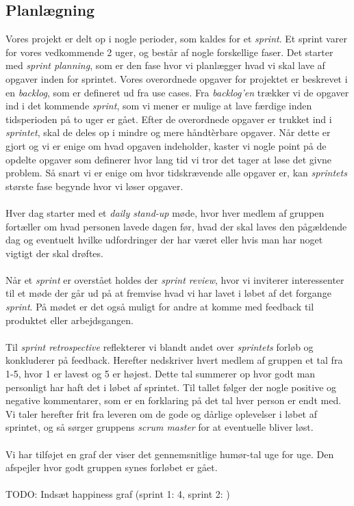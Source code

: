 \subsection{Planlægning}
Vores projekt er delt op i nogle perioder, som kaldes for et \textit{sprint}. Et sprint varer for vores vedkommende 2 uger, og består af nogle forskellige faser.
Det starter med \textit{sprint planning}, som er den fase hvor vi planlægger hvad vi skal lave af opgaver inden for sprintet. Vores overordnede opgaver for projektet er beskrevet i en \textit{backlog}, som er defineret ud fra use cases. Fra \textit{backlog'en} trækker vi de opgaver ind i det kommende \textit{sprint}, som vi mener er mulige at lave færdige inden tidsperioden på to uger er gået. Efter de overordnede opgaver er trukket ind i \textit{sprintet}, skal de deles op i mindre og mere håndtèrbare opgaver. Når dette er gjort og vi er enige om hvad opgaven indeholder, kaster vi nogle point på de opdelte opgaver som definerer hvor lang tid vi tror det tager at løse det givne problem. Så snart vi er enige om hvor tidskrævende alle opgaver er, kan \textit{sprintets} største fase begynde hvor vi løser opgaver.
\\\\
Hver dag starter med et \textit{daily stand-up} møde, hvor hver medlem af gruppen fortæller om hvad personen lavede dagen før, hvad der skal laves den pågældende dag og eventuelt hvilke udfordringer der har været eller hvis man har noget vigtigt der skal drøftes.
\\\\
Når et \textit{sprint} er overstået holdes der \textit{sprint review}, hvor vi inviterer interessenter til et møde der går ud på at fremvise hvad vi har lavet i løbet af det forgange \textit{sprint}. På mødet er det også muligt for andre at komme med feedback til produktet eller arbejdsgangen.
\\\\
Til \textit{sprint retrospective} reflekterer vi blandt andet over \textit{sprintets} forløb og konkluderer på feedback. Herefter nedskriver hvert medlem af gruppen et tal fra 1-5, hvor 1 er lavest og 5 er højest. Dette tal summerer op hvor godt man personligt har haft det i løbet af sprintet. Til tallet følger der nogle positive og negative kommentarer, som er en forklaring på det tal hver person er endt med. Vi taler herefter frit fra leveren om de gode og dårlige oplevelser i løbet af sprintet, og så sørger gruppens \textit{scrum master} for at eventuelle bliver løst.
\\\\
Vi har tilføjet en graf der viser det gennemsnitlige humør-tal uge for uge. Den afspejler hvor godt gruppen synes forløbet er gået.
\\\\
TODO: Indsæt happiness graf (sprint 1: 4, sprint 2: )
